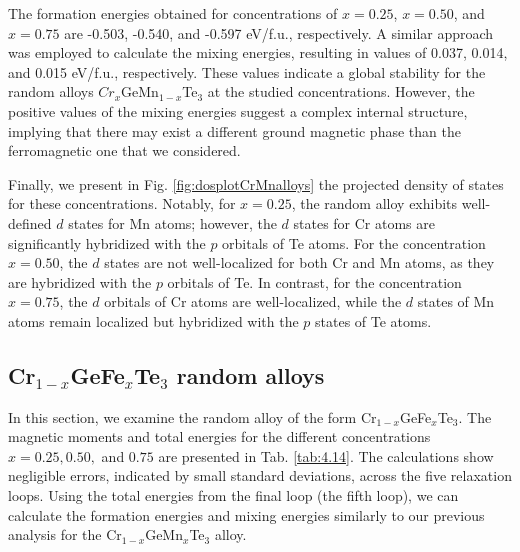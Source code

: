 The formation energies obtained for concentrations of $x=0.25$, $x=0.50$, and $x=0.75$ are -0.503, -0.540, and -0.597 eV/f.u., respectively. A similar approach was employed to calculate the mixing energies, resulting in values of 0.037, 0.014, and 0.015 eV/f.u., respectively. These values indicate a global stability for the random alloys $Cr_{x}$GeMn$_{1-x}$Te$_{3}$ at the studied concentrations. However, the positive values of the mixing energies suggest a complex internal structure, implying that there may exist a different ground magnetic phase than the ferromagnetic one that we considered.

Finally, we present in Fig. \ref{fig:dosplotCrMnalloys} the projected density of states for these concentrations. Notably, for $x=0.25$, the random alloy exhibits well-defined $d$ states for Mn atoms; however, the $d$ states for Cr atoms are significantly hybridized with the $p$ orbitals of Te atoms. For the concentration $x=0.50$, the $d$ states are not well-localized for both Cr and Mn atoms, as they are hybridized with the $p$ orbitals of Te. In contrast, for the concentration $x=0.75$, the $d$ orbitals of Cr atoms are well-localized, while the $d$ states of Mn atoms remain localized but hybridized with the $p$ states of Te atoms.


\subsection{\texorpdfstring{Cr$_{1-x}$GeFe$_{x}$Te$_{3}$ random alloys}{Cr1-xGeFexTe3 random alloys}}

In this section, we examine the random alloy of the form Cr$_{1-x}$GeFe$_{x}$Te$_{3}$. The magnetic moments and total energies for the different concentrations \( x = 0.25, 0.50, \) and \( 0.75 \) are presented in Tab. \ref{tab:4.14}. The calculations show negligible errors, indicated by small standard deviations, across the five relaxation loops. Using the total energies from the final loop (the fifth loop), we can calculate the formation energies and mixing energies similarly to our previous analysis for the Cr$_{1-x}$GeMn$_{x}$Te$_{3}$ alloy.

